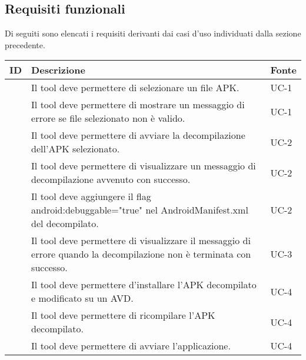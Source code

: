 \subsection{Requisiti funzionali}\label{subsec:requisiti-funzionali}
Di seguiti sono elencati i requisiti derivanti dai casi d'uso individuati dalla sezione precedente.
\begin{longtable}{ | c| C{7cm} |C{3cm} |}
    \hline
    \textbf{ID} & \textbf{Descrizione}                                                                                                  & \textbf{Fonte} \\\hline
           & Il tool deve permettere di selezionare un file APK.                                                                   & UC-1           \\\hline
        & Il tool deve permettere di mostrare un messaggio di errore se file selezionato non è valido.                          & UC-1           \\\hline
    \setcounter{subCount}{0}

           & Il tool deve permettere di avviare la decompilazione dell'APK selezionato.                                            & UC-2           \\\hline
        & Il tool deve permettere di visualizzare un messaggio di decompilazione avvenuto con successo.                         & UC-2           \\\hline
        & Il tool deve aggiungere il flag android:debuggable="true" nel AndroidManifest.xml del decompilato.                    & UC-2           \\\hline
    \setcounter{subCount}{0}

           & Il tool deve permettere di visualizzare il messaggio di errore quando la decompilazione non è terminata con successo. & UC-3           \\\hline
           & Il tool deve permettere d'installare l'APK decompilato e modificato su un AVD.                                        & UC-4           \\\hline
        & Il tool deve permettere di ricompilare l'APK decompilato.                                                             & UC-4           \\\hline
        & Il tool deve permettere di avviare l'applicazione.                                                                    & UC-4           \\\hline


\end{longtable}
